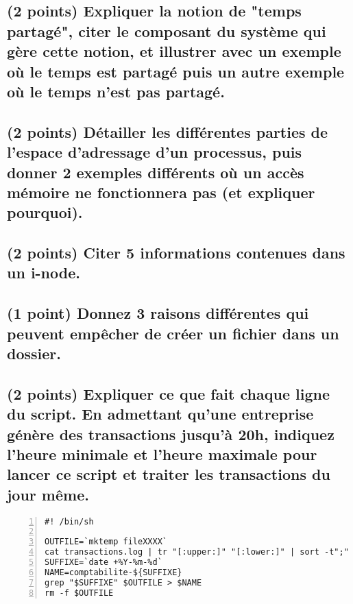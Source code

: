 \documentclass[11pt,a4paper]{article}
\begin{document}
\subsection{(2 points) Expliquer la notion de "temps partagé", citer le composant du système qui gère cette notion, et illustrer avec un exemple où le temps est partagé puis un autre exemple où le temps n'est pas partagé.}

\bigskip

\subsection{(2 points) Détailler les différentes parties de l'espace d'adressage d'un processus, puis donner 2 exemples différents où un accès mémoire ne fonctionnera pas (et expliquer pourquoi).}

\bigskip

\subsection{(2 points) Citer 5 informations contenues dans un i-node.}

\bigskip

\subsection{(1 point) Donnez 3 raisons différentes qui peuvent empêcher de créer un fichier dans un dossier.}

\bigskip

\subsection{(2 points) Expliquer ce que fait chaque ligne du script. En admettant qu'une entreprise génère des transactions jusqu'à 20h, indiquez l'heure minimale et l'heure maximale pour lancer ce script et traiter les transactions du jour même.}

\bigskip

\lstset{language=sh}
\begin{lstlisting}[frame=single,numbers=left,title={script.sh}]
#! /bin/sh

OUTFILE=`mktemp fileXXXX`
cat transactions.log | tr "[:upper:]" "[:lower:]" | sort -t";" -k1 -o $OUTFILE
SUFFIXE=`date +%Y-%m-%d`
NAME=comptabilite-${SUFFIXE}
grep "$SUFFIXE" $OUTFILE > $NAME
rm -f $OUTFILE

\end{lstlisting}
\end{document}

